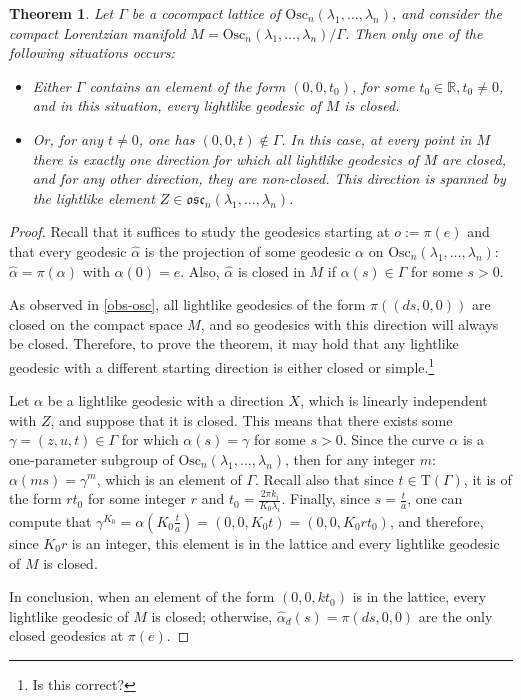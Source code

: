 \documentclass[12pt]{amsart}
\theoremstyle{plain}
\newtheorem{thm}{Theorem}[section]
\theoremstyle{definition}
\theoremstyle{remark}
\begin{document}
\begin{thm}\label{teoremaoscilador}
    Let \( \Gamma \) be a cocompact lattice of \( \text{Osc}_n(\lambda_1, \ldots, \lambda_n) \), and consider the compact Lorentzian manifold \( M = \text{Osc}_n(\lambda_1, \ldots, \lambda_n) / \Gamma \). Then only one of the following situations occurs:
    \begin{itemize}
        \item Either \( \Gamma \) contains an element of the form \( (0, 0, t_0) \), for some \( t_0 \in \mathbb{R}, t_0 \neq 0 \), and in this situation, every lightlike geodesic of \( M \) is closed.
        \item Or, for any \( t \neq 0 \), one has \( (0, 0, t) \notin \Gamma \). In this case, at every point in \( M \) there is exactly one direction for which all lightlike geodesics of \( M \) are closed, and for any other direction, they are non-closed. This direction is spanned by the lightlike element \( Z \in \mathfrak{osc}_n(\lambda_1, \ldots, \lambda_n) \).
    \end{itemize}
\end{thm}

\begin{proof}
    Recall that it suffices to study the geodesics starting at \( o := \pi(e) \) and that every geodesic \( \hat{\alpha} \) is the projection of some geodesic \( \alpha \) on \( \text{Osc}_n(\lambda_1, \ldots, \lambda_n) \): \( \hat{\alpha} = \pi(\alpha) \) with \( \alpha(0) = e \). Also, \( \hat{\alpha} \) is closed in \( M \) if \( \alpha(s) \in \Gamma \) for some \( s > 0 \).
    
    As observed in \ref{obs-osc}, all lightlike geodesics of the form \( \pi((ds, 0, 0)) \) are closed on the compact space \( M \), and so geodesics with this direction will always be closed. Therefore, to prove the theorem, it may hold that any lightlike geodesic with a different starting direction is either closed or simple.\footnote{Is this correct?}
    
    Let \( \alpha \) be a lightlike geodesic with a direction \( X \), which is linearly independent with \( Z \), and suppose that it is closed. This means that there exists some \( \gamma = (z, u, t) \in \Gamma \) for which \( \alpha(s) = \gamma \) for some \( s > 0 \). Since the curve \( \alpha \) is a one-parameter subgroup of \( \text{Osc}_n(\lambda_1, \ldots, \lambda_n) \), then for any integer \( m \): \( \alpha(ms) = \gamma^m \), which is an element of \( \Gamma \). Recall also that since \( t \in \mathrm{T}(\Gamma) \), it is of the form \( r t_0 \) for some integer \( r \) and \( t_0 = \frac{2 \pi k_i}{K_0 \lambda_i} \). Finally, since \( s = \frac{t}{a} \), one can compute that \( \gamma^{K_0} = \alpha\left(K_0 \frac{t}{a}\right) = (0, 0, K_0 t) = (0, 0, K_0 r t_0) \), and therefore, since \( K_0 r \) is an integer, this element is in the lattice and every lightlike geodesic of \( M \) is closed.
    
    In conclusion, when an element of the form \( (0, 0, k t_0) \) is in the lattice, every lightlike geodesic of \( M \) is closed; otherwise, \( \hat{\alpha}_d(s) = \pi(ds, 0, 0) \) are the only closed geodesics at \( \pi(e) \).
\end{proof}
\end{document}
